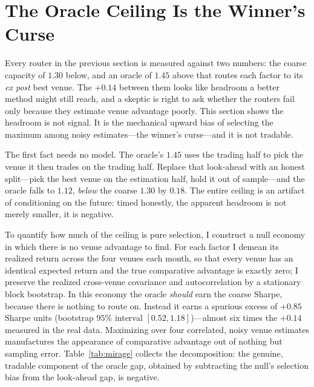 \documentclass[12pt]{article}
\theoremstyle{plain}
\theoremstyle{definition}
\begin{document}
\section{The Oracle Ceiling Is the Winner's Curse}
\label{sec:mirage}

Every router in the previous section is measured against two numbers: the coarse
capacity of $1.30$ below, and an oracle of $1.45$ above that routes each factor
to its \emph{ex post} best venue. The $+0.14$ between them looks like headroom a
better method might still reach, and a skeptic is right to ask whether the
routers fail only because they estimate venue advantage poorly. This section
shows the headroom is not signal. It is the mechanical upward bias of selecting
the maximum among noisy estimates---the winner's curse---and it is not tradable.

The first fact needs no model. The oracle's $1.45$ uses the trading half to pick
the venue it then trades on the trading half. Replace that look-ahead with an
honest split---pick the best venue on the estimation half, hold it out of
sample---and the oracle falls to $1.12$, \emph{below} the coarse $1.30$ by
$0.18$. The entire ceiling is an artifact of conditioning on the future: timed
honestly, the apparent headroom is not merely smaller, it is negative.

To quantify how much of the ceiling is pure selection, I construct a null economy
in which there is no venue advantage to find. For each factor I demean its
realized return across the four venues each month, so that every venue has an
identical expected return and the true comparative advantage is exactly zero;
I preserve the realized cross-venue covariance and autocorrelation by a
stationary block bootstrap. In this economy the oracle \emph{should} earn the
coarse Sharpe, because there is nothing to route on. Instead it earns a spurious
excess of $+0.85$ Sharpe units (bootstrap $95\%$ interval $[0.52,1.18]$)---almost
six times the $+0.14$ measured in the real data. Maximizing over four correlated,
noisy venue estimates manufactures the appearance of comparative advantage out of
nothing but sampling error. Table~\ref{tab:mirage} collects the decomposition:
the genuine, tradable component of the oracle gap, obtained by subtracting the
null's selection bias from the look-ahead gap, is negative.
\end{document}
